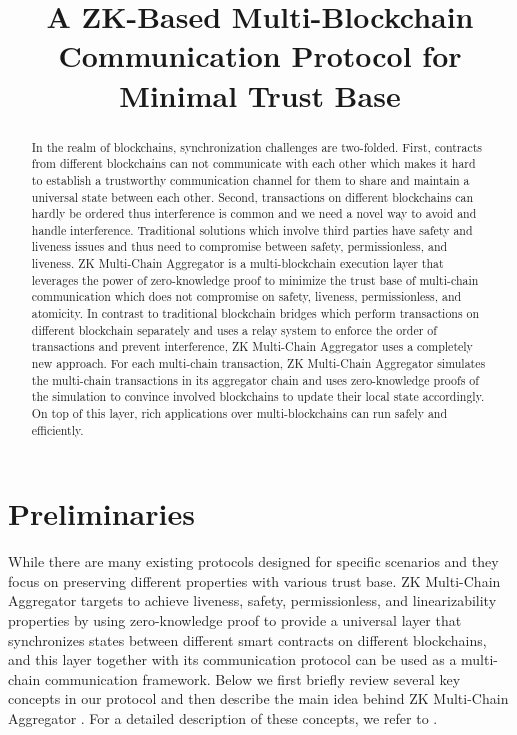 \documentclass[pageno]{jpaper}
\begin{document}
\title{A ZK-Based Multi-Blockchain Communication Protocol for Minimal Trust Base}
\newcommand{\dprotocol}{ZK Multi-Chain Aggregator }
\date{}
\maketitle
\thispagestyle{empty}
\begin{abstract}
In the realm of blockchains, synchronization challenges are two-folded. First, contracts from different blockchains can not communicate with each other which makes it hard to establish a trustworthy communication channel for them to share and maintain a universal state between each other. Second, transactions on different blockchains can hardly be ordered thus interference is common and we need a novel way to avoid and handle interference. Traditional solutions which involve third parties have safety and liveness issues and thus need to compromise between safety, permissionless, and liveness.  \dprotocol is a multi-blockchain execution layer that leverages the power of zero-knowledge proof to minimize the trust base of multi-chain communication which does not compromise on safety, liveness, permissionless, and atomicity. In contrast to traditional blockchain bridges which perform transactions on different blockchain separately and uses a relay system to enforce the order of transactions and prevent interference, \dprotocol uses a completely new approach. For each multi-chain transaction, \dprotocol simulates the multi-chain transactions in its aggregator chain and uses zero-knowledge proofs of the simulation to convince involved blockchains to update their local state accordingly.  On top of this layer, rich applications over multi-blockchains can run safely and efficiently.
\end{abstract}


\section{Preliminaries}
\label{prelimiary}
While there are many existing protocols designed for specific scenarios and they focus on preserving different properties with various trust base. \dprotocol targets to achieve liveness, safety, permissionless, and linearizability properties by using zero-knowledge proof to provide a universal layer that synchronizes states between different smart contracts on different blockchains, and this layer together with its communication protocol can be used as a multi-chain communication framework. Below we first briefly review several key concepts in our protocol and then describe the main idea behind \dprotocol. For a detailed description of these concepts, we refer to \cite{robinson2021survey}. 
\end{document}
